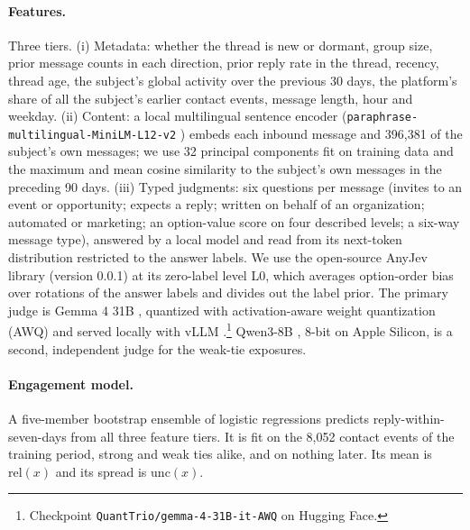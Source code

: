 \documentclass[11pt]{article}
\begin{document}
\paragraph{Features.} Three tiers. (i) Metadata: whether the thread is new or dormant, group size, prior message counts in each direction, prior reply rate in the thread, recency, thread age, the subject's global activity over the previous 30 days, the platform's share of all the subject's earlier contact events, message length, hour and weekday. (ii) Content: a local multilingual sentence encoder (\texttt{paraphrase-multilingual-MiniLM-L12-v2} \citep{reimers2019sentence,reimers2020making}) embeds each inbound message and 396{,}381 of the subject's own messages; we use 32 principal components fit on training data and the maximum and mean cosine similarity to the subject's own messages in the preceding 90 days. (iii) Typed judgments: six questions per message (invites to an event or opportunity; expects a reply; written on behalf of an organization; automated or marketing; an option-value score on four described levels; a six-way message type), answered by a local model and read from its next-token distribution restricted to the answer labels. We use the open-source AnyJev library (version 0.0.1) \citep{anyjev2026} at its zero-label level L0, which averages option-order bias over rotations of the answer labels and divides out the label prior. The primary judge is Gemma 4 31B \citep{gemmateam2026gemma4}, quantized with activation-aware weight quantization (AWQ) and served locally with vLLM \citep{kwon2023efficient}.\footnote{Checkpoint \texttt{QuantTrio/gemma-4-31B-it-AWQ} on Hugging Face.} Qwen3-8B \citep{yang2025qwen3}, 8-bit on Apple Silicon, is a second, independent judge for the weak-tie exposures.

\paragraph{Engagement model.} A five-member bootstrap ensemble of logistic regressions predicts reply-within-seven-days from all three feature tiers. It is fit on the 8{,}052 contact events of the training period, strong and weak ties alike, and on nothing later. Its mean is $\mathrm{rel}(x)$ and its spread is $\mathrm{unc}(x)$.
\end{document}
